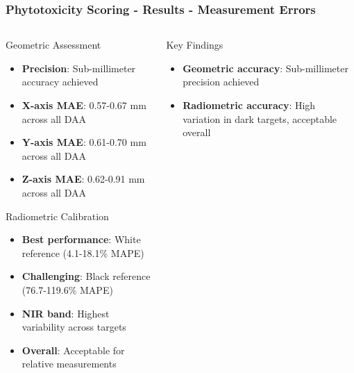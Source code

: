 \documentclass[aspectratio=43]{beamer}
\begin{document}
\begin{frame}
    \frametitle{\small Phytotoxicity Scoring - Results - Measurement Errors}
    
    \begin{columns}
        \begin{column}{0.5\textwidth}
            \begin{block}{Geometric Assessment}
                \scriptsize
                \begin{itemize}
                    \item \textbf{Precision}: Sub-millimeter accuracy achieved
                    \item \textbf{X-axis MAE}: 0.57-0.67 mm across all DAA
                    \item \textbf{Y-axis MAE}: 0.61-0.70 mm across all DAA
                    \item \textbf{Z-axis MAE}: 0.62-0.91 mm across all DAA
                \end{itemize}
            \end{block}
            
            \begin{exampleblock}{Radiometric Calibration}
                \scriptsize
                \begin{itemize}
                    \item \textbf{Best performance}: White reference (4.1-18.1\% MAPE)
                    \item \textbf{Challenging}: Black reference (76.7-119.6\% MAPE)
                    \item \textbf{NIR band}: Highest variability across targets
                    \item \textbf{Overall}: Acceptable for relative measurements
                \end{itemize}
            \end{exampleblock}
        \end{column}
        
        \begin{column}{0.5\textwidth}            
            \begin{alertblock}{Key Findings}
                \scriptsize
                \begin{itemize}
                    \item \textbf{Geometric accuracy}: Sub-millimeter precision achieved
                    \item \textbf{Radiometric accuracy}: High variation in dark targets, acceptable overall
                \end{itemize}
            \end{alertblock}
        \end{column}
    \end{columns}
\end{frame}
\end{document}
